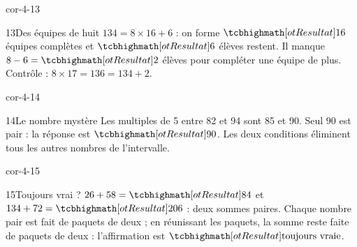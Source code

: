\begin{blocLivre}{cor-4-13}\begin{corrige}{13}{Des équipes de huit}
$134=8\times16+6$ : on forme $\res{16}$ équipes complètes et $\res6$ élèves restent. Il manque $8-6=\res2$ élèves pour compléter une équipe de plus. Contrôle : $8\times17=136=134+2$.
\end{corrige}\end{blocLivre}
\begin{blocLivre}{cor-4-14}\begin{corrige}{14}{Le nombre mystère}
Les multiples de 5 entre 82 et 94 sont 85 et 90. Seul 90 est pair : la réponse est $\res{90}$. Les deux conditions éliminent tous les autres nombres de l’intervalle.
\end{corrige}\end{blocLivre}
\begin{blocLivre}{cor-4-15}\begin{corrige}{15}{Toujours vrai ?}
$26+58=\res{84}$ et $134+72=\res{206}$ : deux sommes paires. Chaque nombre pair est fait de paquets de deux ; en réunissant les paquets, la somme reste faite de paquets de deux : l’affirmation est $\res{\text{toujours vraie}}$.
\end{corrige}\end{blocLivre}
